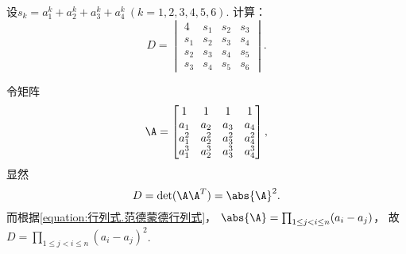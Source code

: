 \begin{example}
设\(s_k = a_1^k + a_2^k + a_3^k + a_4^k\ (k=1,2,3,4,5,6)\).
计算：\[
	D = \begin{vmatrix}
		4 & s_1 & s_2 & s_3 \\
		s_1 & s_2 & s_3 & s_4 \\
		s_2 & s_3 & s_4 & s_5 \\
		s_3 & s_4 & s_5 & s_6
	\end{vmatrix}.
\]
\begin{solution}
令矩阵\[
	\A = \begin{bmatrix}
		1 & 1 & 1 & 1 \\
		a_1 & a_2 & a_3 & a_4 \\
		a_1^2 & a_2^2 & a_3^2 & a_4^2 \\
		a_1^3 & a_2^3 & a_3^3 & a_4^3
	\end{bmatrix},
\]
显然\[
	D = \det(\A\A^T) = \abs{\A}^2.
\]
而根据\cref{equation:行列式.范德蒙德行列式}，
\(\abs{\A}
= \prod_{1 \leq j < i \leq n} (a_i - a_j)\)，
故\(D = \prod_{1 \leq j < i \leq n} (a_i - a_j)^2\).
\end{solution}
\end{example}
